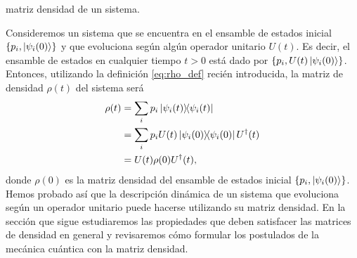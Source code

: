matriz densidad de un sistema.
% 
% 

Consideremos un sistema que se encuentra en el ensamble 
de estados inicial $\{ p_i, \ket{\psi_i(0)}\}$
y que evoluciona según algún operador unitario $U(t)$. Es decir, 
el ensamble de estados en cualquier tiempo $t>0$ está dado por 
$\{p_i, U(t)\ket{\psi_i(0)}\}$. Entonces, utilizando la definición 
\eqref{eq:rho_def} recién introducida, la matriz de
densidad $\rho(t)$ del sistema será
\begin{align} \label{eq:Rho-evolution-H}
	\rho(t) &= \sum_i p_i\dyad{\psi_i(t)}{\psi_i(t)}\nonumber\\
	&= \sum_i p_i U(t) \dyad{\psi_i(0)}{\psi_i(0)}U^{\dagger}(t)
	\nonumber\\
	&= U(t)\rho(0)U^{\dagger}(t),
\end{align}
donde $\rho(0)$ es la matriz densidad del ensamble 
de estados inicial $\{p_i, \ket{\psi_i(0)}\}$. Hemos probado así
que la descripción dinámica de un sistema que evoluciona 
según un operador unitario puede hacerse utilizando 
su matriz densidad. En la sección que sigue 
estudiaremos las propiedades que deben satisfacer 
las matrices de densidad en general y revisaremos cómo 
formular los postulados de la mecánica cuántica con la matriz densidad.


